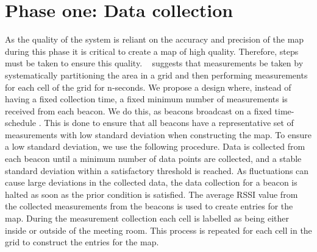 \section{Phase one: Data collection}\label{sec:first_phase}
As the quality of the system is reliant on the accuracy and precision of the map during this phase it is critical to create a map of high quality.
Therefore, steps must be taken to ensure this quality. 
\citeauthor{improving_indoor_localization}~\cite{improving_indoor_localization} suggests that measurements be taken by systematically partitioning the area in a grid and then performing measurements for each cell of the grid for n-seconds. 
We propose a design where, instead of having a fixed collection time, a fixed minimum number of measurements is received from each beacon.
We do this, as beacons broadcast on a fixed time-schedule \cite{apple2023ibeacon}.
This is done to ensure that all beacons have a representative set of measurements with low standard deviation when constructing the map.
To ensure a low standard deviation, we use the following procedure.
Data is collected from each beacon until a minimum number of data points are collected, and a stable standard deviation within a satisfactory threshold is reached.
As fluctuations can cause large deviations in the collected data, the data collection for a beacon is halted as soon as the prior condition is satisfied.
The average RSSI value from the collected measurements from the beacons is used to create entries for the map.
During the measurement collection each cell is labelled as being either inside or outside of the meeting room.
This process is repeated for each cell in the grid to construct the entries for the map. 


